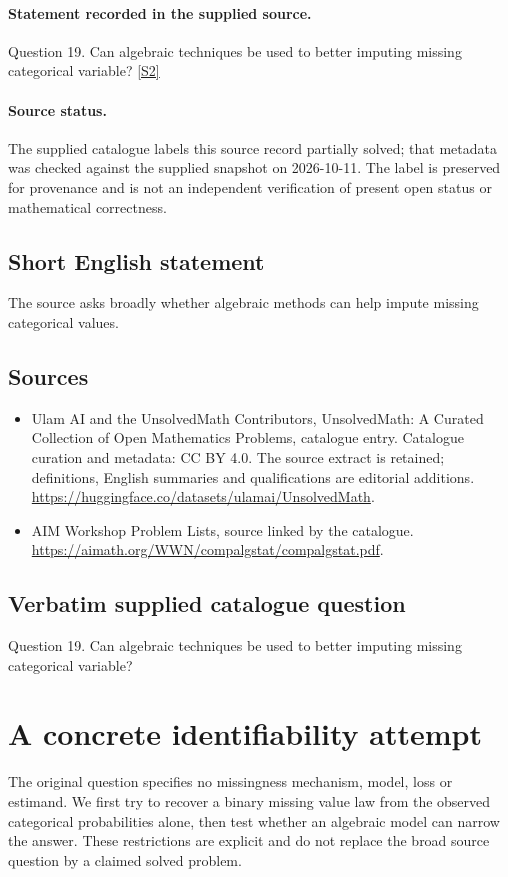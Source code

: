 \documentclass[11pt]{article}
\begin{document}
\paragraph{Statement recorded in the supplied source.}
Question 19. Can algebraic techniques be used to better imputing missing categorical variable? \href{https://aimath.org/WWN/compalgstat/compalgstat.pdf}{[S2]}
\paragraph{Source status.}
The supplied catalogue labels this source record partially solved; that metadata was checked against the supplied snapshot on 2026-10-11. The label is preserved for provenance and is not an independent verification of present open status or mathematical correctness.
\subsection{Short English statement}
The source asks broadly whether algebraic methods can help impute missing categorical values.
\subsection{Sources}
\begin{itemize}
\item[S1] Ulam AI and the UnsolvedMath Contributors, UnsolvedMath: A Curated Collection of Open Mathematics Problems, catalogue entry. Catalogue curation and metadata: CC BY 4.0. The source extract is retained; definitions, English summaries and qualifications are editorial additions.
\url{https://huggingface.co/datasets/ulamai/UnsolvedMath}.
\item[S2] AIM Workshop Problem Lists, source linked by the catalogue.
\url{https://aimath.org/WWN/compalgstat/compalgstat.pdf}.
\end{itemize}
\subsection{Verbatim supplied catalogue question}
Question 19. Can algebraic techniques be used to better imputing missing categorical variable?

\section{A concrete identifiability attempt}
The original question specifies no missingness mechanism, model, loss or
estimand. We first try to recover a binary missing value law from the
observed categorical probabilities alone, then test whether an algebraic
model can narrow the answer. These restrictions are explicit and do not
replace the broad source question by a claimed solved problem.
\end{document}

